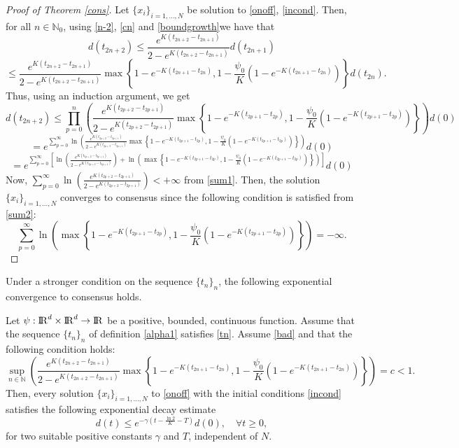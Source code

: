 \documentclass[a4paper,11pt,oneside]{article}
\newcommand{\RR}{{{\rm I} \kern -.15em {\rm R} }}
\begin{document}
	\begin{proof}[Proof of Theorem \ref{cons}]
		Let $\{x_{i}\}_{i=1,\dots,N}$ be solution to \eqref{onoff}, \eqref{incond}. Then, for all $n\in \mathbb{N}_{0}$, using \eqref{n-2}, \eqref{cn} and \eqref{boundgrowth}we have that
		$$d(t_{2n+2})\leq \frac{e^{K(t_{2n+2}-t_{2n+1})}}{2-e^{K(t_{2n+2}-t_{2n+1})}}d(t_{2n+1})$$
		$$\leq \frac{e^{K(t_{2n+2}-t_{2n+1})}}{2-e^{K(t_{2n+2}-t_{2n+1})}}\max\left\{1-e^{-K(t_{2n+1}-t_{2n})},1-\frac{\psi_{0}}{K}(1-e^{-K(t_{2n+1}-t_{2n})})\right\}d(t_{2n}).$$
		Thus, using an induction argument, we get
		$$d(t_{2n+2})\leq \prod_{p=0}^{n}\left(\frac{e^{K(t_{2p+2}-t_{2p+1})}}{2-e^{K(t_{2p+2}-t_{2p+1})}}\max\left\{1-e^{-K(t_{2p+1}-t_{2p})},1-\frac{\psi_{0}}{K}(1-e^{-K(t_{2p+1}-t_{2p})})\right\}\right)d(0)$$
		$$=e^{\sum_{p=0}^{\infty}\ln \left(\frac{e^{K(t_{2p+2}-t_{2p+1})}}{2-e^{K(t_{2p+2}-t_{2p+1})}}\max\left\{1-e^{-K(t_{2p+1}-t_{2p})},1-\frac{\psi_{0}}{K}(1-e^{-K(t_{2p+1}-t_{2p})})\right\}\right)}d(0)$$
		$$=e^{\sum_{p=0}^{\infty}\left[\ln \left(\frac{e^{K(t_{2p+2}-t_{2p+1})}}{2-e^{K(t_{2p+2}-t_{2p+1})}}\right)+\ln\left(\max\left\{1-e^{-K(t_{2p+1}-t_{2p})},1-\frac{\psi_{0}}{K}(1-e^{-K(t_{2p+1}-t_{2p})})\right\}\right)\right]}d(0)$$
		Now, $\sum_{p=0}^{\infty}\ln \left(\frac{e^{K(t_{2p+2}-t_{2p+1})}}{2-e^{K(t_{2p+2}-t_{2p+1})}}\right)<+\infty$ from \eqref{sum1}. Then, the solution $\{x_{i}\}_{i=1,\dots,N}$ converges to consensus since the following condition is satisfied from \eqref{sum2}:
		$$\sum_{p=0}^{\infty}\ln\left(\max\left\{1-e^{-K(t_{2p+1}-t_{2p})},1-\frac{\psi_{0}}{K}(1-e^{-K(t_{2p+1}-t_{2p})})\right\}\right)=-\infty.$$
	\end{proof}
Under a stronger condition on the sequence $\{t_{n}\}_{n}$, the following exponential convergence to consensus holds.
\begin{thm}\label{expcons}
	Let $\psi:\RR^d\times \RR^d\rightarrow\RR$ be a positive, bounded, continuous function. Assume that the sequence $\{t_{n}\}_{n}$ of definition \eqref{alpha1} satisfies \eqref{tn}. Assume \eqref{bad} and that the following condition holds:
	\begin{equation}\label{addcond1}
		\sup_{n\in \mathbb{N}}\left(\frac{e^{K(t_{2n+2}-t_{2n+1})}}{2-e^{K(t_{2n+2}-t_{2n+1})}}\max\left\{1-e^{-K(t_{2n+1}-t_{2n})},1-\frac{\psi_{0}}{K}(1-e^{-K(t_{2n+1}-t_{2n})})\right\}\right)=c<1.
	\end{equation}
	 Then, every solution $\{x_{i}\}_{i=1,\dots,N}$ to \eqref{onoff} with the initial conditions \eqref{incond} satisfies the following exponential decay estimate
	 \begin{equation}\label{expest}
	 	d(t)\leq e^{-\gamma\left(t-\frac{\ln2}{K}-T\right) }d(0),\quad \forall t\geq 0,
	 \end{equation}
	 for two suitable positive constants $\gamma$ and $T$, independent of $N$.
\end{thm}
\end{document}
